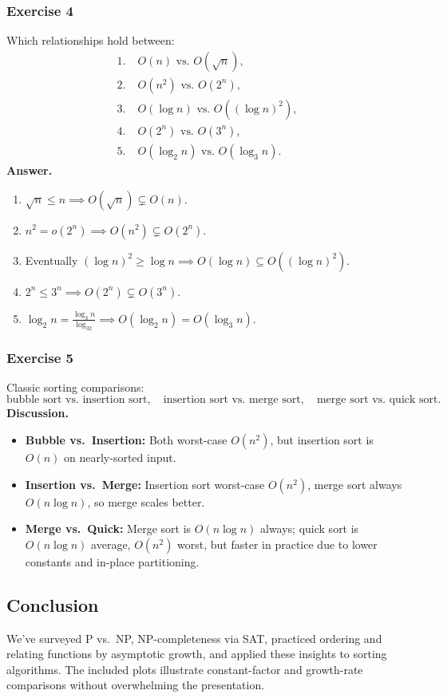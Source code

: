 \documentclass{article}
\begin{document}
\subsubsection{Exercise 4}
Which relationships hold between:
\[
\begin{aligned}
1.\;&O(n)\text{ vs.\ }O(\sqrt n),\\
2.\;&O(n^2)\text{ vs.\ }O(2^n),\\
3.\;&O(\log n)\text{ vs.\ }O((\log n)^2),\\
4.\;&O(2^n)\text{ vs.\ }O(3^n),\\
5.\;&O(\log_2n)\text{ vs.\ }O(\log_3n).
\end{aligned}
\]
\textbf{Answer.}
\begin{enumerate}[label=\arabic*.]
  \item \(\sqrt n\le n\implies O(\sqrt n)\subsetneq O(n)\).
  \item \(n^2=o(2^n)\implies O(n^2)\subsetneq O(2^n)\).
  \item Eventually \((\log n)^2\ge\log n\implies O(\log n)\subseteq O((\log n)^2)\).
  \item \(2^n\le3^n\implies O(2^n)\subsetneq O(3^n)\).
  \item \(\log_2n=\tfrac{\log_3n}{\log_32}\implies O(\log_2n)=O(\log_3n)\).
\end{enumerate}

\subsubsection{Exercise 5}
Classic sorting comparisons:
\[
\text{bubble sort vs.\ insertion sort},\quad
\text{insertion sort vs.\ merge sort},\quad
\text{merge sort vs.\ quick sort}.
\]
\textbf{Discussion.}
\begin{itemize}
  \item \textbf{Bubble vs.\ Insertion:} Both worst-case \(O(n^2)\), but insertion sort is \(O(n)\) on nearly-sorted input.
  \item \textbf{Insertion vs.\ Merge:} Insertion sort worst-case \(O(n^2)\), merge sort always \(O(n\log n)\), so merge scales better.
  \item \textbf{Merge vs.\ Quick:} Merge sort is \(O(n\log n)\) always; quick sort is \(O(n\log n)\) average, \(O(n^2)\) worst, but faster in practice due to lower constants and in-place partitioning.
\end{itemize}

\subsection{Conclusion}
We’ve surveyed P vs.\ NP, NP-completeness via SAT, practiced ordering and relating functions by asymptotic growth, and applied these insights to sorting algorithms. The included plots illustrate constant-factor and growth-rate comparisons without overwhelming the presentation.
\end{document}
